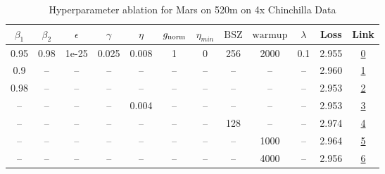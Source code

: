 \begin{table}[H]
\centering
\caption{Hyperparameter ablation for Mars on 520m on 4x Chinchilla Data}
\label{tab:ablation_mars_520m_on_4x_chinchilla_data}
\begin{tabular}{cccccccccccc}
\toprule
$\beta_1$ & $\beta_2$ & $\epsilon$ & $\gamma$ & $\eta$ & $g_{\mathrm{norm}}$ & $\eta_{min}$ & $\mathrm{BSZ}$ & $\mathrm{warmup}$ & $\lambda$ & Loss & Link \\
\midrule
0.95 & 0.98 & 1e-25 & 0.025 & 0.008 & 1 & 0 & 256 & 2000 & 0.1 & 2.955 & \href{https://wandb.ai/marin-community/optimizer-scaling/runs/sweep-520m-42B-mars50507flr0.008-wd0.1-minlr0-warmup2000-b10.95--b5cf73}{0} \\
\midrule
0.9 & -- & -- & -- & -- & -- & -- & -- & -- & -- & 2.960 & \href{https://wandb.ai/marin-community/optimizer-scaling/runs/sweep-520m-42B-marsffc1cflr0.008-wd0.1-minlr0-warmup2000-b10.9-b-c89306}{1} \\
0.98 & -- & -- & -- & -- & -- & -- & -- & -- & -- & 2.953 & \href{https://wandb.ai/marin-community/optimizer-scaling/runs/sweep-520m-42B-mars10209dlr0.008-wd0.1-minlr0-warmup2000-b10.98--1ae65b}{2} \\
-- & -- & -- & -- & 0.004 & -- & -- & -- & -- & -- & 2.953 & \href{https://wandb.ai/marin-community/optimizer-scaling/runs/sweep-520m-42B-marsf1861clr0.004-wd0.1-minlr0-warmup2000-b10.95--ff7186}{3} \\
-- & -- & -- & -- & -- & -- & -- & 128 & -- & -- & 2.974 & \href{https://wandb.ai/marin-community/optimizer-scaling/runs/sweep-520m-42B-marsf698a0lr0.008-wd0.1-minlr0-warmup2000-b10.95--039978}{4} \\
-- & -- & -- & -- & -- & -- & -- & -- & 1000 & -- & 2.964 & \href{https://wandb.ai/marin-community/optimizer-scaling/runs/sweep-520m-42B-mars396887lr0.008-wd0.1-minlr0-warmup1000-b10.95--61c217}{5} \\
-- & -- & -- & -- & -- & -- & -- & -- & 4000 & -- & 2.956 & \href{https://wandb.ai/marin-community/optimizer-scaling/runs/sweep-520m-42B-mars5f83cclr0.008-wd0.1-minlr0-warmup4000-b10.95--d5771f}{6} \\
\bottomrule
\end{tabular}
\end{table}


